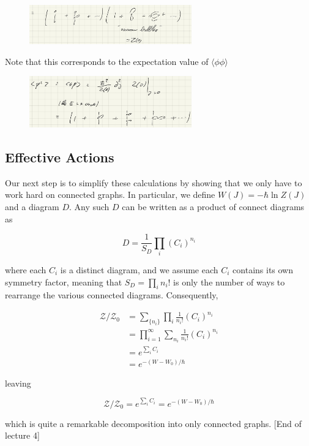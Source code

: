 \documentclass{article}
\theoremstyle{definition}
\begin{document}
\begin{figure}
  \centering
  \includegraphics[width=7cm]{res/AQFT/vacuum_bubble_product}
  \label{vacuum_bubble_product}
\end{figure}

Note that this corresponds to the expectation value of $\langle \phi \phi
\rangle$

\begin{figure}
  \centering
  \includegraphics[width=7cm]{res/AQFT/E_2_mean}
  \label{E_2_mean}
\end{figure}

\subsection{Effective Actions}

Our next step is to simplify these calculations by showing that we only have to
work hard on connected graphs. In particular, we define $W(J) = -\hbar \ln Z(J)$
and a diagram $D$. Any such $D$ can be written as a product of connect diagrams
as

\begin{equation}
  D = \frac{1}{S_D} \prod_i (C_i)^{n_i}
\end{equation}

where each $C_i$ is a distinct diagram, and we assume each $C_i$ contains its
own symmetry factor, meaning that $S_D = \prod_i n_i!$ is only the number of
ways to rearrange the various connected diagrams. Consequently,

\begin{align*}
  \mathcal{Z} / \mathcal{Z}_0
  &= \sum_{\{n_i\}} \prod_i \frac{1}{n_i!} (C_i)^{n_i} \\
  &= \prod_{i=1}^\infty \sum_{n_i} \frac{1}{n_i!} (C_i)^{n_i} \\
  &= e^{\sum_i C_i} \\
  &= e^{-(W - W_0) / \hbar}
\end{align*}

leaving

\begin{equation}
  \mathcal{Z} / \mathcal{Z}_0 = e^{\sum_i C_i} = e^{-(W - W_0) / \hbar}
\end{equation}

which is quite a remarkable decomposition into only connected graphs. [End of lecture 4]
\end{document}
